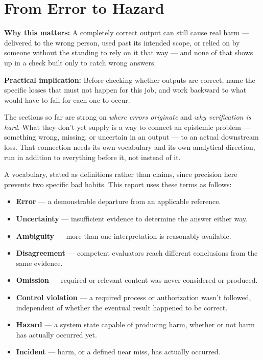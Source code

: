 \section{From Error to Hazard}

\textbf{Why this matters:} A completely correct output can still cause real harm --- delivered to the wrong person, used past its intended scope, or relied on by someone without the standing to rely on it that way --- and none of that shows up in a check built only to catch wrong answers.

\textbf{Practical implication:} Before checking whether outputs are correct, name the specific losses that must not happen for this job, and work backward to what would have to fail for each one to occur.

The sections so far are strong on \emph{where errors originate} and \emph{why verification is hard}. What they don't yet supply is a way to connect an epistemic problem --- something wrong, missing, or uncertain in an output --- to an actual downstream loss. That connection needs its own vocabulary and its own analytical direction, run in addition to everything before it, not instead of it.

A vocabulary, stated as definitions rather than claims, since precision here prevents two specific bad habits. This report uses these terms as follows:

\begin{itemize}
\item \textbf{Error} --- a demonstrable departure from an applicable reference.
\item \textbf{Uncertainty} --- insufficient evidence to determine the answer either way.
\item \textbf{Ambiguity} --- more than one interpretation is reasonably available.
\item \textbf{Disagreement} --- competent evaluators reach different conclusions from the same evidence.
\item \textbf{Omission} --- required or relevant content was never considered or produced.
\item \textbf{Control violation} --- a required process or authorization wasn't followed, independent of whether the eventual result happened to be correct.
\item \textbf{Hazard} --- a system state capable of producing harm, whether or not harm has actually occurred yet.
\item \textbf{Incident} --- harm, or a defined near miss, has actually occurred.
\end{itemize}

